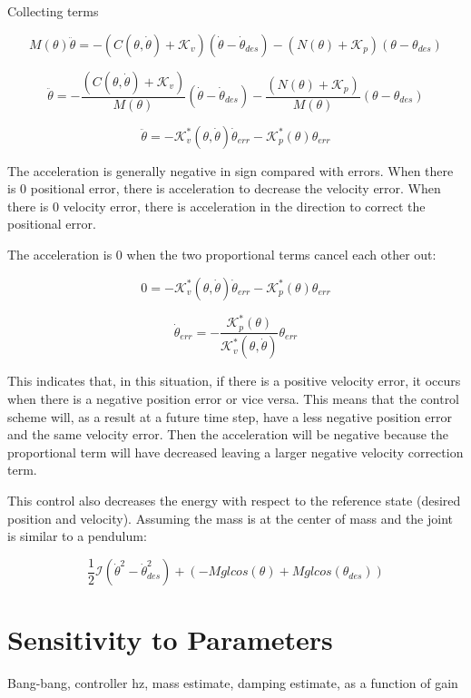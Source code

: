 \documentclass[12pt, letterpaper, oneside, notitlepage, onecolumn]{article}
\newcommand{\bbs}[1]{\section{#1}}
\begin{document}
Collecting terms

\begin{equation}
M(\theta) \ddot{\theta}
= 
-(C(\theta, \dot{\theta})
+ \mathcal{K}_{v}) (\dot{\theta} - \dot{\theta}_{des})
- (N(\theta)
+ \mathcal{K}_{p}) (\theta - \theta_{des})
\end{equation}

\begin{equation}
\ddot{\theta}
= 
-\dfrac{(C(\theta, \dot{\theta})
+ \mathcal{K}_{v})}{M(\theta)}
(\dot{\theta} - \dot{\theta}_{des})
-\dfrac{(N(\theta)
+ \mathcal{K}_{p})}{M(\theta)} (\theta - \theta_{des})
\end{equation}

\begin{equation}
\ddot{\theta}
= 
-\mathcal{K}_{v}^{*}(\theta, \dot{\theta})
\dot{\theta}_{err}
-\mathcal{K}_{p}^{*}(\theta)
\theta_{err}
\end{equation}

The acceleration is generally negative in sign compared with errors. When there
is 0 positional error, there is acceleration to decrease the velocity error.
When there is 0 velocity error, there is acceleration in the direction to
correct the positional error.

The acceleration is 0 when the two proportional terms cancel each other out:

\begin{equation}
0
= 
-\mathcal{K}_{v}^{*}(\theta, \dot{\theta})
\dot{\theta}_{err}
-\mathcal{K}_{p}^{*}(\theta)
\theta_{err}
\end{equation}

\begin{equation}
\dot{\theta}_{err}
= 
-\dfrac{\mathcal{K}_{p}^{*}(\theta)}{\mathcal{K}_{v}^{*}(\theta, \dot{\theta})}
\theta_{err}
\end{equation}

This indicates that, in this situation, if there is a positive velocity error, 
it occurs when there is a negative position error or vice versa. This means that
the control scheme will, as a result at a future time step, have a less negative
position error and the same velocity error. Then the acceleration will be
negative because the proportional term will have decreased leaving a larger
negative velocity correction term.

This control also decreases the energy with respect to the reference state
(desired position and velocity). Assuming the mass is at the center of mass and
the joint is similar to a pendulum:

\begin{equation}
\dfrac{1}{2}\mathcal{I}(\dot{\theta}^{2} - \dot{\theta}_{des}^{2})
+ ( -Mglcos(\theta) + Mglcos(\theta_{des}))
\end{equation}

\bbs{Sensitivity to Parameters}

Bang-bang, controller hz, mass estimate, damping estimate, as a function of gain
\end{document}
